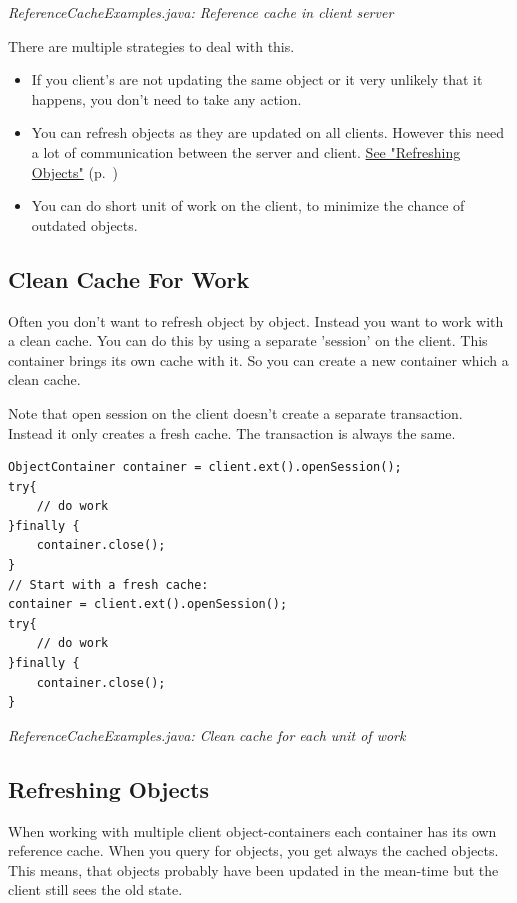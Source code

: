{\small\itshape ReferenceCacheExamples.java: Reference cache in client server\par}
\medskip

There are multiple strategies to deal with this.

\begin{itemize}
\item If you client's are not updating the same object or it very unlikely that it happens, you don't need to take any action.
\item You can refresh objects as they are updated on all clients. However this need a lot of communication between the server and client. \hyperref[ref:client-server-refreshing-objects]{See "Refreshing Objects"} (p.~\pageref{ref:client-server-refreshing-objects})
\item You can do short unit of work on the client, to minimize the chance of outdated objects.
\end{itemize}

\subsection*{Clean Cache For Work}

Often you don't want to refresh object by object. Instead you want to work with a clean cache. You can do this by using a separate 'session' on the client. This container brings its own cache with it. So you can create a new container which a clean cache.

Note that open session on the client doesn't create a separate transaction. Instead it only creates a fresh cache. The transaction is always the same.

\begin{lstlisting}
ObjectContainer container = client.ext().openSession();
try{
    // do work
}finally {
    container.close();
}
// Start with a fresh cache:
container = client.ext().openSession();
try{
    // do work
}finally {
    container.close();
}
\end{lstlisting}

{\small\itshape ReferenceCacheExamples.java: Clean cache for each unit of work\par}
\medskip

\subsection{Refreshing Objects}
\label{ref:client-server-refreshing-objects}

When working with multiple client object-containers each container has its own reference cache. When you query for objects, you get always the cached objects. This means, that objects probably have been updated in the mean-time but the client still sees the old state.


